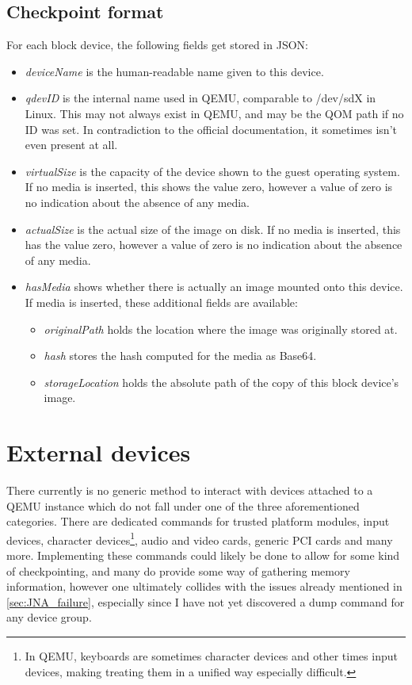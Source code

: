 \subsection{Checkpoint format}
For each block device, the following fields get stored in JSON:
\begin{itemize}
    \item \emph{deviceName} is the human-readable name given to this device.
    \item \emph{qdevID} is the internal name used in QEMU, comparable to /dev/sdX in Linux.
    This may not always exist in QEMU, and may be the QOM path if no ID was set.
    In contradiction to the official documentation, it sometimes isn't even present at all.
    \item \emph{virtualSize} is the capacity of the device shown to the guest operating system.
    If no media is inserted, this shows the value zero,
    however a value of zero is no indication about the absence of any media.
    \item \emph{actualSize} is the actual size of the image on disk.
    If no media is inserted, this has the value zero,
    however a value of zero is no indication about the absence of any media.
    \item \emph{hasMedia} shows whether there is actually an image mounted onto this device.
    If media is inserted, these additional fields are available:
    \begin{itemize}
        \item \emph{originalPath} holds the location where the image was originally stored at.
        \item \emph{hash} stores the hash computed for the media as Base64.
        \item \emph{storageLocation} holds the absolute path of the copy of this block device's image.
    \end{itemize}
\end{itemize}

\section{External devices}\label{sec:external_approach}
There currently is no generic method to interact with devices attached to a QEMU instance
which do not fall under one of the three aforementioned categories.
There are dedicated commands for trusted platform modules, input devices, character devices\footnote{In QEMU, keyboards are sometimes character devices and other times input devices, making treating them in a unified way especially difficult.},
audio and video cards, generic PCI cards and many more\cite{qmp-commands}.
Implementing these commands could likely be done to allow for some kind of checkpointing,
and many do provide some way of gathering memory information,
however one ultimately collides with the issues already mentioned in \autoref{sec:JNA_failure},
especially since I have not yet discovered a dump command for any device group.

